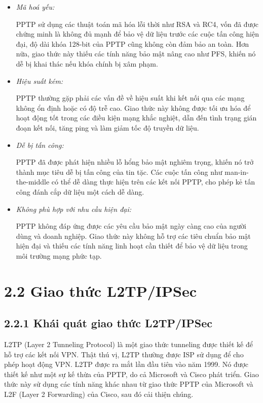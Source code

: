     \begin{itemize}
        \item \textit{Mã hoá yếu:}

        PPTP sử dụng các thuật toán mã hóa lỗi thời như RSA và RC4, vốn đã được chứng minh là không đủ mạnh để bảo vệ dữ liệu trước các cuộc tấn công hiện đại, độ dài khóa 128-bit của PPTP cũng không còn đảm bảo an toàn. Hơn nữa, giao thức này thiếu các tính năng bảo mật nâng cao như PFS, khiến nó dễ bị khai thác nếu khóa chính bị xâm phạm.

         \item \textit{Hiệu suất kém:}

         PPTP thường gặp phải các vấn đề về hiệu suất khi kết nối qua các mạng không ổn định hoặc có độ trễ cao. Giao thức này không được tối ưu hóa để hoạt động tốt trong các điều kiện mạng khắc nghiệt, dẫn đến tình trạng gián đoạn kết nối, tăng ping và làm giảm tốc độ truyền dữ liệu.
         \item \textit{Dễ bị tấn công:} 

         PPTP đã được phát hiện nhiều lỗ hổng bảo mật nghiêm trọng, khiến nó trở thành mục tiêu dễ bị tấn công của tin tặc. Các cuộc tấn công như man-in-the-middle có thể dễ dàng thực hiện trên các kết nối PPTP, cho phép kẻ tấn công đánh cắp dữ liệu một cách dễ dàng.
         
         \item \textit{Không phù hợp với nhu cầu hiện đại:}

         PPTP không đáp ứng được các yêu cầu bảo mật ngày càng cao của người dùng và doanh nghiệp. Giao thức này không hỗ trợ các tiêu chuẩn bảo mật hiện đại và thiếu các tính năng linh hoạt cần thiết để bảo vệ dữ liệu trong môi trường mạng phức tạp.
    \end{itemize}
 \section*{2.2 Giao thức L2TP/IPSec }
  \subsection*{2.2.1 Khái quát giao thức L2TP/IPSec}

 
 L2TP (Layer 2 Tunneling Protocol) là một giao thức tunneling được thiết kế để hỗ trợ các kết nối VPN. Thật thú vị, L2TP thường được ISP sử dụng để cho phép hoạt động VPN. L2TP được ra mắt lần đầu tiên vào năm 1999. Nó được thiết kế như một sự kế thừa của PPTP, do cả Microsoft và Cisco phát triển. Giao thức này sử dụng các tính năng khác nhau từ giao thức PPTP của Microsoft và L2F (Layer 2 Forwarding) của Cisco, sau đó cải thiện chúng.

